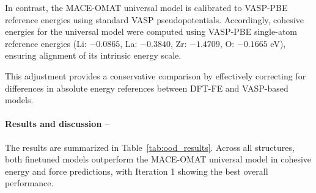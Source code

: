 \documentclass[12pt,a4paper,oneside]{book}
\begin{document}
In contrast, the MACE-OMAT universal model is calibrated to VASP-PBE reference energies using standard VASP pseudopotentials. Accordingly, cohesive energies for the universal model were computed using VASP-PBE single-atom reference energies (Li: $-0.0865$, La: $-0.3840$, Zr: $-1.4709$, O: $-0.1665$ eV), ensuring alignment of its intrinsic energy scale.

This adjustment provides a conservative comparison by effectively correcting for differences in absolute energy references between DFT-FE and VASP-based models.

\paragraph{Results and discussion --}
The results are summarized in Table~\ref{tab:ood_results}. Across all structures, both finetuned models outperform the MACE-OMAT universal model in cohesive energy and force predictions, with Iteration 1 showing the best overall performance.

\begin{table}[htbp]
\centering
\caption{Performance on unseen and out-of-distribution (OOD) interface structures. Structure IDs are arbitrary labels used for cross-referencing within this table. CE Err is reported in meV/atom and Force error is reported in meV/\AA.}
\label{tab:ood_results}

\end{table}
\end{document}
